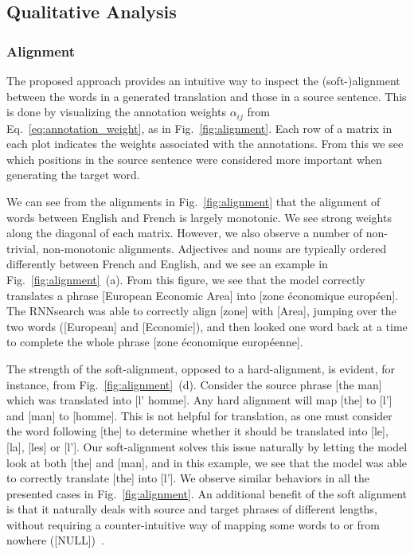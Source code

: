 \documentclass{article}
\begin{document}
\subsection{Qualitative Analysis}

\subsubsection{Alignment}

The proposed approach provides an intuitive way to inspect the
\mbox{(soft-)alignment} between the words in a generated translation and those
in a source sentence.  This is done by visualizing the annotation weights
$\alpha_{ij}$ from Eq.~\eqref{eq:annotation_weight}, as in
Fig.~\ref{fig:alignment}. Each row of a matrix in each plot indicates the
weights associated with the annotations. From this we see which positions in the
source sentence were considered more important when generating the target word. 

We can see from the alignments in Fig.~\ref{fig:alignment} that the alignment of
words between English and French is largely monotonic. We see strong weights
along the diagonal of each matrix. However, we also observe a number of
non-trivial, non-monotonic alignments. Adjectives and nouns are typically
ordered differently between French and English, and we see an example in
Fig.~\ref{fig:alignment}~(a). From this figure, we see that the model correctly
translates a phrase [European Economic Area] into [zone \'economique
europ\'een]. The RNNsearch was able to correctly align [zone] with [Area],
jumping over the two words ([European] and [Economic]), and then looked one word
back at a time to complete the whole phrase [zone \'economique europ\'eenne]. 

The strength of the soft-alignment, opposed to a hard-alignment, is evident, for
instance, from Fig.~\ref{fig:alignment}~(d). Consider the source phrase [the
man] which was translated into [l' homme]. Any hard alignment will map [the] to
[l'] and [man] to [homme]. This is not helpful for translation, as one must
consider the word following [the] to determine whether it should be translated
into [le], [la], [les] or [l'].  Our soft-alignment solves this issue naturally
by letting the model look at both [the] and [man], and in this example, we see
that the model was able to correctly translate [the] into [l']. We observe
similar behaviors in all the presented cases in Fig.~\ref{fig:alignment}. An
additional benefit of the soft alignment is that it naturally deals with source
and target phrases of different lengths, without requiring a counter-intuitive
way of mapping some words to or from nowhere ([NULL])~\citep[see, e.g.,
Chapters~4 and 5 of][]{Koehn2010}.
\end{document}
